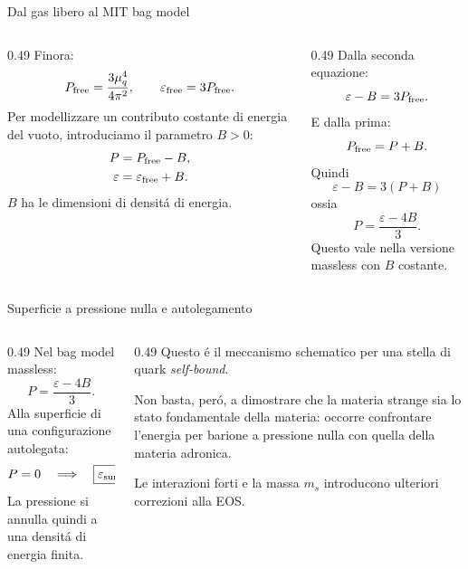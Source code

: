 \begin{frame}[t]{Dal gas libero al MIT bag model}
\small
\begin{columns}[T,onlytextwidth]
\begin{column}{0.49\textwidth}
Finora:
\[
P_{\rm free}=\frac{3\mu_q^4}{4\pi^2},
\qquad\varepsilon_{\rm free}=3P_{\rm free}.
\]
Per modellizzare un contributo costante di energia del vuoto, introduciamo il parametro $B>0$:
\[
\begin{aligned}
P&=P_{\rm free}-B,\\
\varepsilon&=\varepsilon_{\rm free}+B.
\end{aligned}
\]
$B$ ha le dimensioni di densit\'a di energia.
\end{column}
\begin{column}{0.49\textwidth}
Dalla seconda equazione:
\[
\varepsilon-B=3P_{\rm free}.
\]
E dalla prima:
\[
P_{\rm free}=P+B.
\]
Quindi
\[
\varepsilon-B=3(P+B)
\]
ossia
\[
\boxed{P=\frac{\varepsilon-4B}{3}}.
\]
Questo vale nella versione massless con $B$ costante.
\end{column}
\end{columns}
\end{frame}

\begin{frame}[t]{Superficie a pressione nulla e autolegamento}
\small
\begin{columns}[T,onlytextwidth]
\begin{column}{0.49\textwidth}
Nel bag model massless:
\[
P=\frac{\varepsilon-4B}{3}.
\]
Alla superficie di una configurazione autolegata:
\[
P=0\quad\Longrightarrow\quad
\boxed{\varepsilon_{\rm surf}=4B}.
\]
La pressione si annulla quindi a una densit\'a di energia finita.
\end{column}
\begin{column}{0.49\textwidth}
Questo \'e il meccanismo schematico per una stella di quark \emph{self-bound}.

Non basta, per\'o, a dimostrare che la materia strange sia lo stato fondamentale della materia: occorre confrontare l'energia per barione a pressione nulla con quella della materia adronica.

Le interazioni forti e la massa $m_s$ introducono ulteriori correzioni alla EOS.
\end{column}
\end{columns}
\end{frame}

